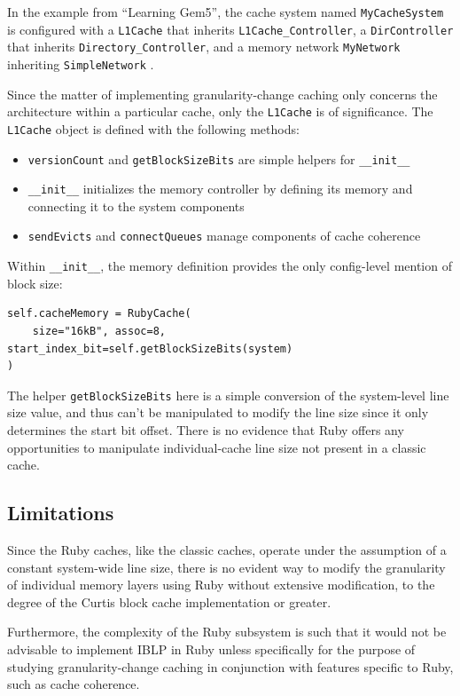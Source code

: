 \documentclass[12pt,twoside]{reedthesis}
\begin{document}
	In the example from ``Learning Gem5'', the cache system named \verb`MyCacheSystem` is configured with a \verb`L1Cache` that inherits \verb`L1Cache_Controller`, a \verb`DirController` that inherits \verb`Directory_Controller`, and a memory network \verb`MyNetwork` inheriting \verb`SimpleNetwork` \cite{gem5-tutorial}.

	Since the matter of implementing granularity-change caching only concerns the architecture within a particular cache, only the \verb`L1Cache` is of significance. The \verb`L1Cache` object is defined with the following methods: \begin{itemize}
		\item \verb`versionCount` and \verb`getBlockSizeBits` are simple helpers for \verb`__init__`
		\item \verb`__init__` initializes the memory controller by defining its memory and connecting it to the system components
		\item \verb`sendEvicts` and \verb`connectQueues` manage components of cache coherence
	\end{itemize}

	Within \verb`__init__`, the memory definition provides the only config-level mention of block size: \begin{verbatim}
self.cacheMemory = RubyCache(
    size="16kB", assoc=8, start_index_bit=self.getBlockSizeBits(system)
)\end{verbatim}

	The helper \verb`getBlockSizeBits` here is a simple conversion of the system-level line size value, and thus can't be manipulated to modify the line size since it only determines the start bit offset. There is no evidence that Ruby offers any opportunities to manipulate individual-cache line size not present in a classic cache.

	\subsection*{Limitations}

	Since the Ruby caches, like the classic caches, operate under the assumption of a constant system-wide line size, there is no evident way to modify the granularity of individual memory layers using Ruby without extensive modification, to the degree of the Curtis block cache implementation or greater.

	Furthermore, the complexity of the Ruby subsystem is such that it would not be advisable to implement IBLP in Ruby unless specifically for the purpose of studying granularity-change caching in conjunction with features specific to Ruby, such as cache coherence.
\end{document}

